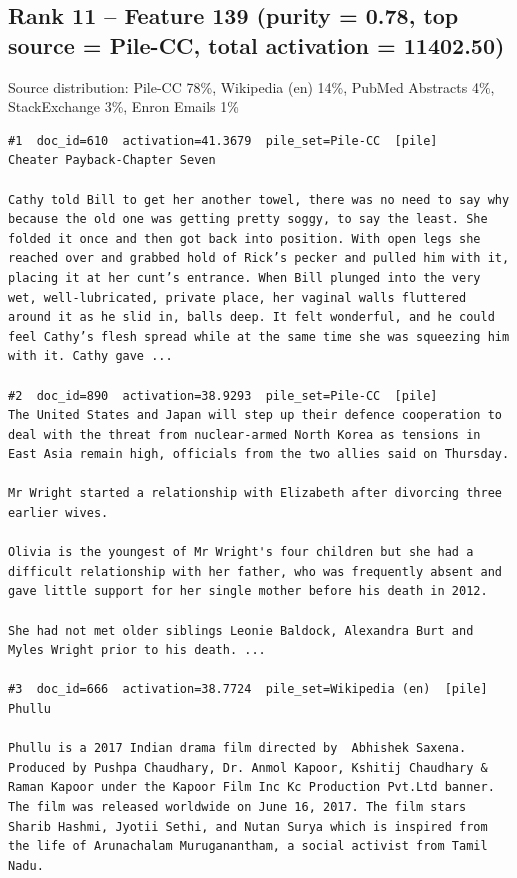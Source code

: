 \subsection*{Rank 11 -- Feature 139 (purity = 0.78, top source = Pile-CC, total activation = 11402.50)}

Source distribution: Pile-CC 78\%, Wikipedia (en) 14\%, PubMed Abstracts 4\%, StackExchange 3\%, Enron Emails 1\%

\begin{verbatim}
#1  doc_id=610  activation=41.3679  pile_set=Pile-CC  [pile]
Cheater Payback-Chapter Seven

Cathy told Bill to get her another towel, there was no need to say why because the old one was getting pretty soggy, to say the least. She folded it once and then got back into position. With open legs she reached over and grabbed hold of Rick’s pecker and pulled him with it, placing it at her cunt’s entrance. When Bill plunged into the very wet, well-lubricated, private place, her vaginal walls fluttered around it as he slid in, balls deep. It felt wonderful, and he could feel Cathy’s flesh spread while at the same time she was squeezing him with it. Cathy gave ...

#2  doc_id=890  activation=38.9293  pile_set=Pile-CC  [pile]
The United States and Japan will step up their defence cooperation to deal with the threat from nuclear-armed North Korea as tensions in East Asia remain high, officials from the two allies said on Thursday.

Mr Wright started a relationship with Elizabeth after divorcing three earlier wives.

Olivia is the youngest of Mr Wright's four children but she had a difficult relationship with her father, who was frequently absent and gave little support for her single mother before his death in 2012.

She had not met older siblings Leonie Baldock, Alexandra Burt and Myles Wright prior to his death. ...

#3  doc_id=666  activation=38.7724  pile_set=Wikipedia (en)  [pile]
Phullu

Phullu is a 2017 Indian drama film directed by  Abhishek Saxena. Produced by Pushpa Chaudhary, Dr. Anmol Kapoor, Kshitij Chaudhary & Raman Kapoor under the Kapoor Film Inc Kc Production Pvt.Ltd banner. The film was released worldwide on June 16, 2017. The film stars Sharib Hashmi, Jyotii Sethi, and Nutan Surya which is inspired from the life of Arunachalam Muruganantham, a social activist from Tamil Nadu. 


\end{verbatim}

